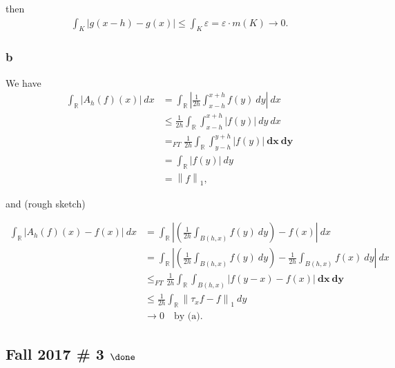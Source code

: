 \begin{solution}
then
\begin{align*}
\int_K {\left\lvert {g(x-h) - g(x)} \right\rvert} \leq \int_K \varepsilon = \varepsilon \cdot m(K) \to 0.
\end{align*}

\hypertarget{b-10}{%
\subsubsection{b}\label{b-10}}

We have
\begin{align*}
\int_{\mathbb{R}}{\left\lvert {A_h(f)(x)} \right\rvert} ~dx 
&= \int_{\mathbb{R}}{\left\lvert {\frac{1}{2h} \int_{x-h}^{x+h} f(y)~dy} \right\rvert} ~dx \\
&\leq \frac{1}{2h} \int_{\mathbb{R}}\int_{x-h}^{x+h} {\left\lvert {f(y)} \right\rvert} ~dy ~dx    \\
&=_{FT} \frac{1}{2h} \int_{\mathbb{R}}\int_{y-h}^{y+h} {\left\lvert {f(y)} \right\rvert} ~\mathbf{dx} ~\mathbf{dy}    \\
&= \int_{\mathbb{R}}{\left\lvert {f(y)} \right\rvert} ~{dy} \\
&= {\left\lVert {f} \right\rVert}_1
,\end{align*}

and (rough sketch)

\begin{align*}
\int_{\mathbb{R}}{\left\lvert {A_h(f)(x) - f(x)} \right\rvert} ~dx 
&= \int_{\mathbb{R}}{\left\lvert { \left(\frac{1}{2h} \int_{B(h, x)} f(y)~dy\right) - f(x)} \right\rvert}~dx \\
&= \int_{\mathbb{R}}{\left\lvert { \left(\frac{1}{2h} \int_{B(h, x)} f(y)~dy\right) - \frac{1}{2h}\int_{B(h, x)} f(x) ~dy} \right\rvert}~dx \\
&\leq_{FT} \frac{1}{2h} \int_{\mathbb{R}}\int_{B(h, x)}{\left\lvert { f(y-x) - f(x)} \right\rvert} ~\mathbf{dx} ~\mathbf{dy} \\
&\leq \frac 1 {2h} \int_{\mathbb{R}}{\left\lVert {\tau_x f - f} \right\rVert}_1 ~dy \\
&\to 0 \quad\text{by (a)}
.\end{align*}

\end{solution}

\hypertarget{fall-2017-3-done}{%
\subsection{\texorpdfstring{Fall 2017 \# 3
\(\done\)}{Fall 2017 \# 3 \textbackslash done}}\label{fall-2017-3-done}}

